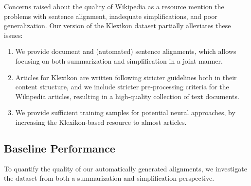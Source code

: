 \documentclass[10pt, a4paper]{article}
\begin{document}
Concerns raised about the quality of Wikipedia as a resource \cite{xu-etal-2015-problems} mention the problems with sentence alignment, inadequate simplifications, and poor generalization. Our version of the Klexikon dataset partially alleviates these issues:
\begin{enumerate}
	\item We provide document and (automated) sentence alignments, which allows focusing on both summarization and simplification in a joint manner.
	\item Articles for Klexikon are written following stricter guidelines both in their content structure, and we include stricter pre-processing criteria for the Wikipedia articles, resulting in a high-quality collection of text documents.
	\item We provide sufficient training samples for potential neural approaches, by increasing the Klexikon-based resource to almost  articles.
\end{enumerate}



\subsection{Baseline Performance}
\label{sec:baseline}
To quantify the quality of our automatically generated alignments, we investigate the dataset from both a summarization and simplification perspective.
\end{document}
